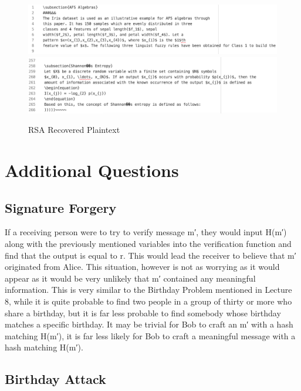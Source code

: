 \documentclass[]{article}
\begin{document}
\begin{figure}[H]
	\includegraphics[height=\textheight/6,width=\textwidth]{rsa_plain1.png}
	\includegraphics[height=\textheight/6,width=\textwidth]{rsa_plain2.png}	
	\caption{RSA Recovered Plaintext}
	\centering
\end{figure}

\pagebreak


\vspace*{-0.8cm}
\section*{\hfil Additional Questions\hfil}

\subsection*{Signature Forgery}

 If a receiving person were to try to verify message m′, they would input H(m′) along with the previously mentioned variables into the verification function and find that the output is equal to r. This would lead the receiver to believe that m′ originated from Alice. This situation, however is not as worrying as it would appear as it would be very unlikely that m′ contained any meaningful information. This is very similar to the Birthday Problem mentioned in Lecture 8, while it is quite probable to find two people in a group of thirty or more who share a birthday, but it is far less probable to find somebody whose birthday matches a specific birthday. It may be trivial for Bob to craft an m′ with a hash matching H(m′), it is far less likely for Bob to craft a meaningful message with a hash matching H(m′).

\subsection*{Birthday Attack}
\end{document}
